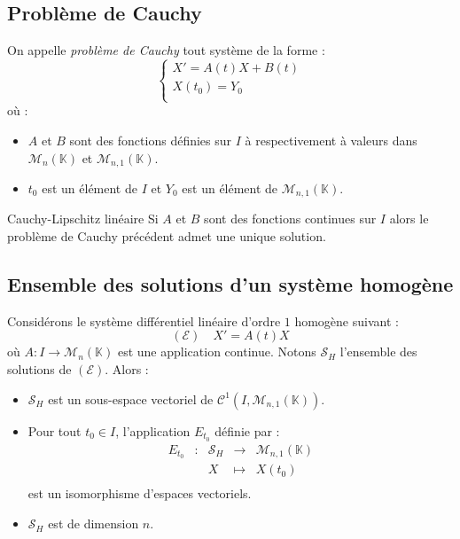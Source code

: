 \documentclass[a4paper,10pt]{report}
\begin{document}
\subsection{Problème de Cauchy}
\begin{Definition}{} On appelle \emph{problème de Cauchy} tout système de la forme :
$$ \left\lbrace \begin{array}{l}
X'=A(t)X+B(t) \\
X(t_0)=Y_0 \\
\end{array}\right.$$
où :
\begin{itemize}
\item $A$ et $B$ sont des fonctions définies sur $I$ à respectivement à valeurs dans $\mathcal{M}_n(\mathbb{K})$ et $\mathcal{M}_{n,1}(\mathbb{K})$.
\item $t_0$ est un élément de $I$ et $Y_0$ est un élément de $\mathcal{M}_{n,1}(\mathbb{K})$.
\end{itemize}
\end{Definition}

\begin{Theoreme}{Cauchy-Lipschitz linéaire} Si $A$ et $B$ sont des fonctions continues sur $I$ alors le problème de Cauchy précédent admet une unique solution.
\end{Theoreme}

\subsection{Ensemble des solutions d'un système homogène}

\begin{Proposition}{} Considérons le système différentiel linéaire d'ordre $1$ homogène suivant :
$$ (\mathcal{E}) \quad X'=A(t)X$$
où $A : I \rightarrow \mathcal{M}_n(\mathbb{K})$ est une application continue. Notons $\mathcal{S}_H$ l'ensemble des solutions de $(\mathcal{E})$. Alors :

\begin{itemize}
\item $\mathcal{S}_H$ est un sous-espace vectoriel de $\mathcal{C}^1(I, \mathcal{M}_{n,1}(\mathbb{K}))$.
\item Pour tout $t_0 \in I$, l'application $E_{t_0}$ définie par :
$$ \begin{array}{cclll}
E_{t_0} & : & \mathcal{S}_H & \rightarrow & \mathcal{M}_{n,1}(\mathbb{K}) \\
& & X & \mapsto & X(t_0) \\
\end{array}$$
est un isomorphisme d'espaces vectoriels. 
\item $\mathcal{S}_H$ est de dimension $n$.
\end{itemize}
\end{Proposition}
\end{document}
